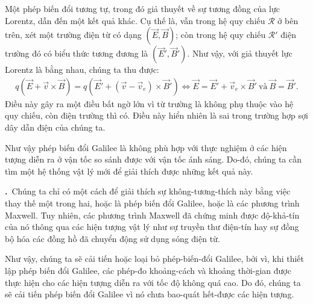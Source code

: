 \documentclass[12pt]{book}
\newcounter{paranum}
\newcommand{\nparagraph}{\noindent\refstepcounter{paranum}\textbf{\theparanum.}\ }
\begin{document}
Một phép biến đổi tương tự, trong đó giả thuyết về sự tương đồng của lực Lorentz, dẫn đến một kết quả khác. Cụ thế là, vẫn trong hệ quy chiếu $\mathscr{R}$ ở bên trên, xét một trường điện từ có dạng $(\vec{E},\vec{B})$; còn trong hệ quy chiếu $\mathscr{R}'$ điện trường đó có biểu thức tương đương là $(\vec{E}',\vec{B}')$. Như vậy, với giả thuyết lực Lorentz là bằng nhau, chúng ta thu được:
\begin{align}
    q(\vec{E}+\vec{v}\times\vec{B})=q(\vec{E}'+(\vec{v}-\vec{v}_e)\times\vec{B}')\Longleftrightarrow \vec{E}=\vec{E}'+\vec{v}_e\times\vec{B}'\ \text{và}\ \vec{B}=\vec{B}'.
\end{align}
Điều này gây ra một điều bất ngờ lớn vì từ trường là không phụ thuộc vào hệ quy chiếu, còn điện trường thì có. Điều này hiển nhiên là sai trong trường hợp sợi dây dẫn điện của chúng ta.

Như vậy phép biến đổi Galilee là không phù hợp với thực nghiệm ở các hiện tượng diễn ra ở vận tốc so sánh được với vận tốc ánh sáng. Do-đó, chúng ta cần tìm một hệ thống vật lý mới để giải thích được những kết quả này.

\nparagraph Chúng ta chỉ có một cách để giải thích sự không-tương-thích này bằng việc thay thế một trong hai, hoặc là phép biến đổi Galilee, hoặc là các phương trình Maxwell. Tuy nhiên, các phương trình Maxwell đã chứng minh được độ-khả-tín của nó thông qua các hiện tượng vật lý như sự truyền thư điện-tín hay sự đồng bộ hóa các đồng hồ đã chuyển động sử dụng sóng điện từ.

Như vậy, chúng ta sẽ cải tiến hoặc loại bỏ phép-biến-đổi Galilee, bởi vì, khi thiết lập phép biến đổi Galilee, các phép-đo khoảng-cách và khoảng thời-gian được thực hiện cho các hiện tượng diễn ra với tốc độ không quá cao. Do đó, chúng ta sẽ cải tiến phép biến đổi Galilee vì nó chưa bao-quát hết-được các hiện tượng.
\end{document}
